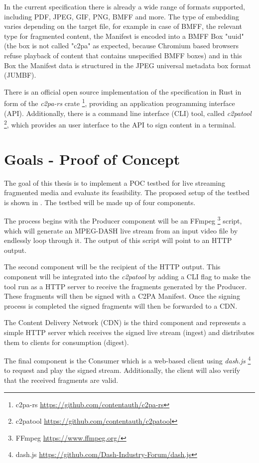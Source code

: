 \documentclass[a4paper]{article}
\begin{document}
In the current specification there is already a wide range of formats supported, including PDF, JPEG, GIF, PNG, BMFF and more. The type of embedding varies depending on the target file, for example in case of BMFF, the relevant type for fragmented content, the Manifest is encoded into a BMFF Box "uuid" (the box is not called "c2pa" as expected, because Chromium based browsers refuse playback of content that contains unspecified BMFF boxes) and in this Box the Manifest data is structured in the JPEG universal metadata box format (JUMBF).

There is an official open source implementation of the specification in Rust in form of the \textit{c2pa-rs} crate \footnote{c2pa-rs \url{https://github.com/contentauth/c2pa-rs}}, providing an application programming interface (API). Additionally, there is a command line interface (CLI) tool, called \textit{c2patool} \footnote{c2patool \url{https://github.com/contentauth/c2patool}}, which provides an user interface to the API to sign content in a terminal.

\section{Goals - Proof of Concept}

The goal of this thesis is to implement a POC testbed for live streaming fragmented media and evaluate its feasibility. The proposed setup of the testbed is shown in . The testbed will be made up of four components. 

The process begins with the Producer component will be an FFmpeg \footnote{FFmpeg \url{https://www.ffmpeg.org/}} script, which will generate an MPEG-DASH live stream from an input video file by endlessly loop through it. The output of this script will point to an HTTP output.

The second component will be the recipient of the HTTP output. This component will be integrated into the \textit{c2patool} by adding a CLI flag to make the tool run as a HTTP server to receive the fragments generated by the Producer. These fragments will then be signed with a C2PA Manifest. Once the signing process is completed the signed fragments will then be forwarded to a CDN.

The Content Delivery Network (CDN) is the third component and represents a simple HTTP server which receives the signed live stream (ingest) and distributes them to clients for consumption (digest).

The final component is the Consumer which is a web-based client using \textit{dash.js} \footnote{dash.js \url{https://github.com/Dash-Industry-Forum/dash.js}} to request and play the signed stream. Additionally, the client will also verify that the received fragments are valid.
\end{document}
